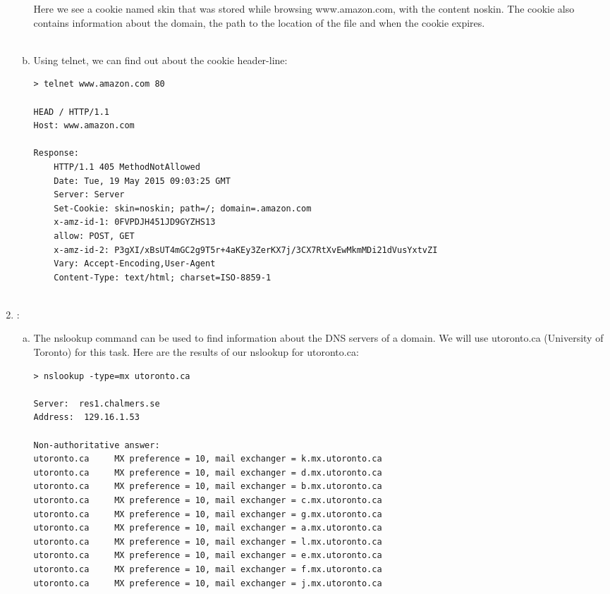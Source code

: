 \documentclass[a4paper,9pt,fleqn]{article}
\begin{document}
\begin{enumerate}[{Task} 1]
\begin{enumerate}[a)]
Here we see a cookie named {\outp skin} that was stored while browsing
{\outp www.amazon.com}, with the content {\outp noskin}. The cookie also
contains information about the domain, the path to the location of the
file and when the cookie expires.
\\
\\ 
\item 
Using {\outp telnet}, we can find out about the cookie header-line:

\begin{lstlisting}[basicstyle=\small]
> telnet www.amazon.com 80

HEAD / HTTP/1.1
Host: www.amazon.com

Response:
	HTTP/1.1 405 MethodNotAllowed
	Date: Tue, 19 May 2015 09:03:25 GMT
	Server: Server
	Set-Cookie: skin=noskin; path=/; domain=.amazon.com
	x-amz-id-1: 0FVPDJH451JD9GYZHS13
	allow: POST, GET
	x-amz-id-2: P3gXI/xBsUT4mGC2g9T5r+4aKEy3ZerKX7j/3CX7RtXvEwMkmMDi21dVusYxtvZI
	Vary: Accept-Encoding,User-Agent
	Content-Type: text/html; charset=ISO-8859-1


\end{lstlisting}

\end{enumerate}

\item :
\begin{enumerate}[a)]
\item 
The {\outp nslookup} command can be used to find information about the DNS servers of a domain.
We will use {\outp utoronto.ca} (University of Toronto) for this task.  Here are the results of
our {\outp nslookup} for {\outp utoronto.ca}:

\begin{lstlisting}
> nslookup -type=mx utoronto.ca
	
Server:  res1.chalmers.se
Address:  129.16.1.53

Non-authoritative answer:
utoronto.ca     MX preference = 10, mail exchanger = k.mx.utoronto.ca
utoronto.ca     MX preference = 10, mail exchanger = d.mx.utoronto.ca
utoronto.ca     MX preference = 10, mail exchanger = b.mx.utoronto.ca
utoronto.ca     MX preference = 10, mail exchanger = c.mx.utoronto.ca
utoronto.ca     MX preference = 10, mail exchanger = g.mx.utoronto.ca
utoronto.ca     MX preference = 10, mail exchanger = a.mx.utoronto.ca
utoronto.ca     MX preference = 10, mail exchanger = l.mx.utoronto.ca
utoronto.ca     MX preference = 10, mail exchanger = e.mx.utoronto.ca
utoronto.ca     MX preference = 10, mail exchanger = f.mx.utoronto.ca
utoronto.ca     MX preference = 10, mail exchanger = j.mx.utoronto.ca


\end{lstlisting}
\end{enumerate}
\end{enumerate}
\end{document}
